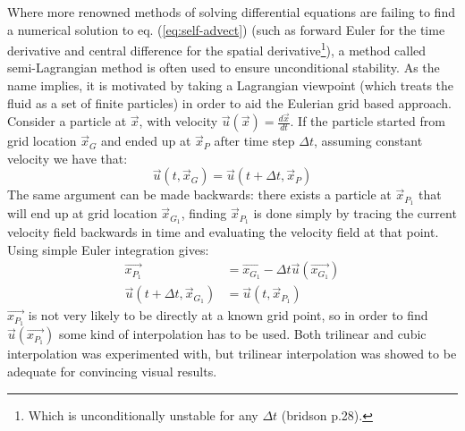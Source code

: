 Where more renowned methods of solving differential equations are failing to find a numerical solution to eq. (\ref{eq:self-advect}) (such as forward Euler for the time derivative and central difference for the spatial derivative\footnote{Which is unconditionally unstable for any \begin{math}\Delta t\end{math} (bridson p.28).}), a method called semi-Lagrangian method is often used to ensure unconditional stability. As the name implies, it is motivated by taking a Lagrangian viewpoint (which treats the fluid as a set of finite particles) in order to aid the Eulerian grid based approach. Consider a particle at  \begin{math}\vec{x}\end{math}, with velocity \begin{math}\vec{u}(\vec{x}) = \frac{d\vec{x}}{dt}\end{math}. If the particle started from grid location \begin{math}\vec{x}_G\end{math} and ended up at \begin{math}\vec{x}_P\end{math} after time step \begin{math}\Delta t \end{math}, assuming constant velocity we have that: 
\begin{equation}
\vec{u}(t,\vec{x}_G) = \vec{u}(t+\Delta t,\vec{x}_P)  
\end{equation}
The same argument can be made backwards: there exists a particle at \begin{math}\vec{x}_{P_1} \end{math} that will end up at grid location \begin{math}\vec{x}_{G_1}\end{math}, finding \begin{math}\vec{x}_{P_1}\end{math} is done simply by tracing the current velocity field backwards in time and evaluating the velocity field at that point. Using simple Euler integration gives: 
	\begin{align}
					      \label{eq:lagrangian}\vec{x_{P_1}}  & =    \vec{x_{G_1}} -  \Delta t \vec{u}(\vec{x_{G_1}})  \\ 
		\vec{u}(t + \Delta t,\vec{x}_{G_1}) &  =    \vec{u}(t,\vec{x}_{P_1}) 
	\end{align}
\begin{math} \vec{x_{P_1}} \end{math} is not very likely to be directly at a known grid point, so in order to find \begin{math} \vec{u}(\vec{x_{P_1}}) \end{math} some kind of interpolation has to be used. Both trilinear and cubic interpolation was experimented with, but trilinear interpolation was showed to be adequate for convincing visual results. 